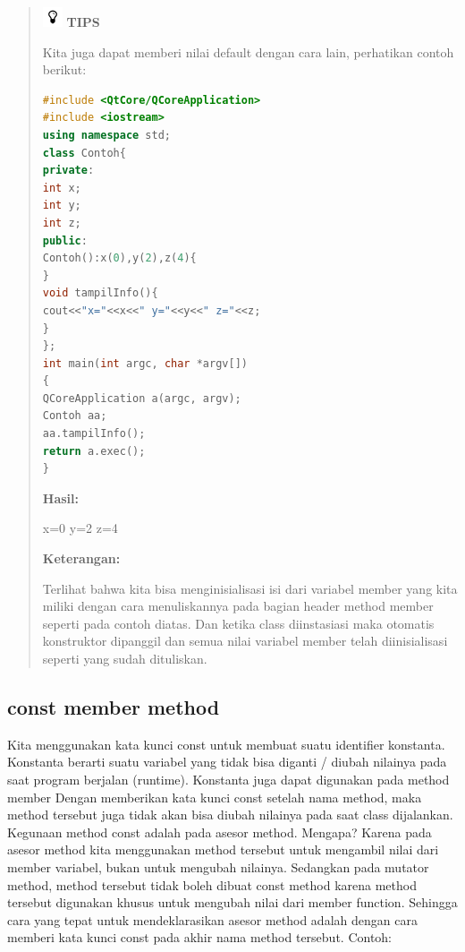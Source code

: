 \begin{quotation}
\includegraphics{../manuscript/images/tips}	\textbf{TIPS} 
	
	Kita juga
	dapat memberi nilai default dengan cara lain, perhatikan contoh berikut:
	
\begin{lstlisting}[language=c++, caption=Memberi nilai default pada constructor, label=contoh6-11]
#include <QtCore/QCoreApplication>
#include <iostream>
using namespace std;
class Contoh{
private:
int x;
int y;
int z;
public:
Contoh():x(0),y(2),z(4){
}
void tampilInfo(){
cout<<"x="<<x<<" y="<<y<<" z="<<z;
}
};
int main(int argc, char *argv[])
{
QCoreApplication a(argc, argv);
Contoh aa;
aa.tampilInfo();
return a.exec();
}
\end{lstlisting}
	
	\textbf{Hasil:}
	
\begin{lcverbatim}
x=0 y=2 z=4
\end{lcverbatim}
	
	\textbf{Keterangan:}
	
	Terlihat bahwa kita bisa menginisialisasi isi dari variabel member yang
	kita miliki dengan cara menuliskannya pada bagian header method member
	seperti pada contoh diatas. Dan ketika class diinstasiasi maka otomatis
	konstruktor dipanggil dan semua nilai variabel member telah
	diinisialisasi seperti yang sudah dituliskan.
\end{quotation}


\subsection{const member method}\label{const-member-method}

Kita menggunakan kata kunci const untuk membuat suatu identifier
konstanta. Konstanta berarti suatu variabel yang tidak bisa diganti /
diubah nilainya pada saat program berjalan (runtime). Konstanta juga
dapat digunakan pada method member Dengan memberikan kata kunci const
setelah nama method, maka method tersebut juga tidak akan bisa diubah
nilainya pada saat class dijalankan. Kegunaan method const adalah pada
asesor method. Mengapa? Karena pada asesor method kita menggunakan
method tersebut untuk mengambil nilai dari member variabel, bukan untuk
mengubah nilainya. Sedangkan pada mutator method, method tersebut tidak
boleh dibuat const method karena method tersebut digunakan khusus untuk
mengubah nilai dari member function. Sehingga cara yang tepat untuk
mendeklarasikan asesor method adalah dengan cara memberi kata kunci
const pada akhir nama method tersebut. Contoh:

